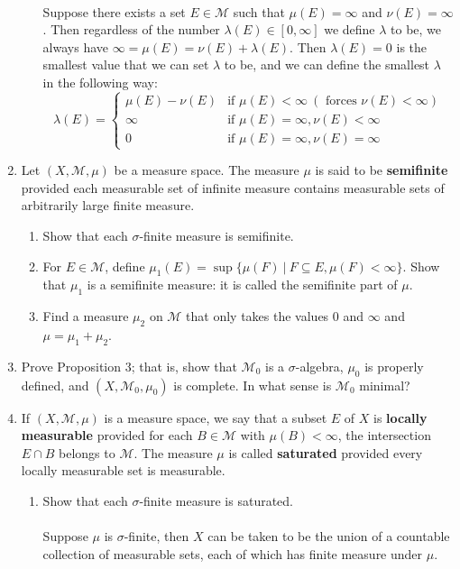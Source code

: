 \begin{enumerate}
\begin{enumerate}[label=(\roman*),align=left]
		\\Suppose there exists a set $E\in\mathcal{M}$ such that $\mu(E)=\infty$ and $\nu(E)=\infty$. 
		Then regardless of the number $\lambda(E)\in[0,\infty]$ we define $\lambda$ to be, we always have $\infty=\mu(E)=\nu(E)+\lambda(E)$.
		Then $\lambda(E)=0$ is the smallest value that we can set $\lambda$ to be, and we can define the smallest $\lambda$ in the following way:
		\[
		\lambda(E)=
		\begin{cases}
			\mu(E)-\nu(E)&\text{if }\mu(E)<\infty\ (\text{ forces }\nu(E)<\infty)\\
			\infty&\text{if }\mu(E)=\infty,\nu(E)<\infty\\
			0&\text{if }\mu(E)=\infty,\nu(E)=\infty
		\end{cases}
		\]
	\end{enumerate}
	\item Let $(X,\mathcal{M},\mu)$ be a measure space.
	The measure $\mu$ is said to be \textbf{semifinite} provided each measurable set of infinite measure contains measurable sets of arbitrarily large finite measure.
	\begin{enumerate}[label=(\roman*),align=left]  
		\item Show that each $\sigma$-finite measure is semifinite.
		\item For $E\in\mathcal{M}$, define $\mu_1(E)=\sup\{\mu(F)\ |\ F\subseteq E,\mu(F)<\infty\}$. 
		Show that $\mu_1$ is a semifinite measure: it is called the semifinite part of $\mu$.
		\item Find a measure $\mu_2$ on $\mathcal{M}$ that only takes the values $0$ and $\infty$ and $\mu=\mu_1+\mu_2$.
	\end{enumerate}
	\item Prove Proposition 3; that is, show that $\mathcal{M}_0$ is a $\sigma$-algebra, $\mu_0$ is properly defined, and $(X,\mathcal{M}_0,\mu_0)$ is complete. In what sense is $\mathcal{M}_0$ minimal?
	\item If $(X,\mathcal{M},\mu)$ is a measure space, we say that a subset $E$ of $X$ is \textbf{locally measurable} provided for each $B\in\mathcal{M}$ with $\mu(B)<\infty$, the intersection $E\cap B$ belongs to $\mathcal{M}$.
	The measure $\mu$ is called \textbf{saturated} provided every locally measurable set is measurable.
	\begin{enumerate}[label=(\roman*),align=left]  
		\item Show that each $\sigma$-finite measure is saturated.\\
		\\Suppose $\mu$ is $\sigma$-finite, then $X$ can be taken to be the union of a countable collection of measurable sets, each of which has finite measure under $\mu$.

\end{enumerate}
\end{enumerate}
